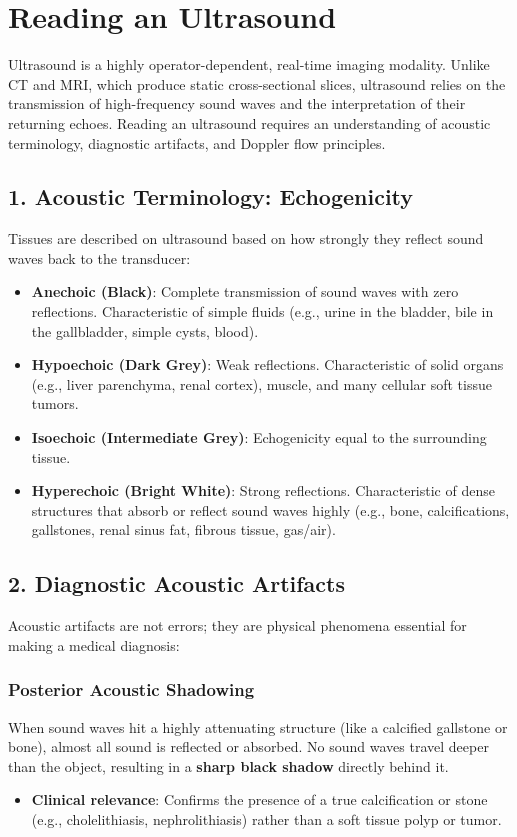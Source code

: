 \chapter{Reading an Ultrasound}

\label{ch:read_ultrasound}

Ultrasound is a highly operator-dependent, real-time imaging modality. Unlike CT and MRI, which produce static cross-sectional slices, ultrasound relies on the transmission of high-frequency sound waves and the interpretation of their returning echoes. Reading an ultrasound requires an understanding of acoustic terminology, diagnostic artifacts, and Doppler flow principles.


\section*{1. Acoustic Terminology: Echogenicity}
Tissues are described on ultrasound based on how strongly they reflect sound waves back to the transducer:

\begin{itemize}
    \item \textbf{Anechoic (Black)}: Complete transmission of sound waves with zero reflections. Characteristic of simple fluids (e.g., urine in the bladder, bile in the gallbladder, simple cysts, blood).
    \item \textbf{Hypoechoic (Dark Grey)}: Weak reflections. Characteristic of solid organs (e.g., liver parenchyma, renal cortex), muscle, and many cellular soft tissue tumors.
    \item \textbf{Isoechoic (Intermediate Grey)}: Echogenicity equal to the surrounding tissue.
    \item \textbf{Hyperechoic (Bright White)}: Strong reflections. Characteristic of dense structures that absorb or reflect sound waves highly (e.g., bone, calcifications, gallstones, renal sinus fat, fibrous tissue, gas/air).
\end{itemize}


\section*{2. Diagnostic Acoustic Artifacts}
Acoustic artifacts are not errors; they are physical phenomena essential for making a medical diagnosis:

\subsection*{Posterior Acoustic Shadowing}
When sound waves hit a highly attenuating structure (like a calcified gallstone or bone), almost all sound is reflected or absorbed. No sound waves travel deeper than the object, resulting in a \textbf{sharp black shadow} directly behind it. 
\begin{itemize}
    \item \textbf{Clinical relevance}: Confirms the presence of a true calcification or stone (e.g., cholelithiasis, nephrolithiasis) rather than a soft tissue polyp or tumor.
\end{itemize}


